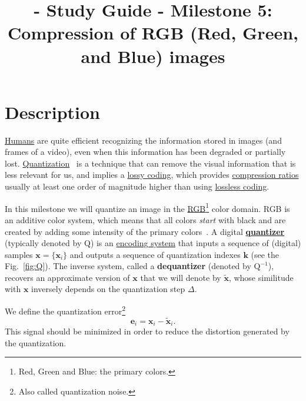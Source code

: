 
\title{\SM{} - Study Guide - Milestone 5: Compression of RGB (Red, Green, and Blue) images}

\maketitle

\tableofcontents

\section{Description}
\href{https://en.wikipedia.org/wiki/Visual_system}{Humans} are quite
efficient recognizing the information stored in images (and frames of
a video), even when this information has been degraded or partially
lost. \href{https://en.wikipedia.org/wiki/Quantization_(signal_processing)}{Quantization}~\cite{sayood2017introduction,vetterli2014foundations}
is a technique that can remove the visual information that is less
relevant for us, and implies a
\href{https://en.wikipedia.org/wiki/Lossy_compression}{lossy coding},
which provides
\href{https://en.wikipedia.org/wiki/Data_compression_ratio}{compression
  ratios} usually at least one order of magnitude higher than using
\href{https://en.wikipedia.org/wiki/Lossless_compression}{lossless
  coding}.

In this milestone we will quantize an image in the
\href{https://en.wikipedia.org/wiki/RGB_color_model}{RGB\footnote{Red,
    Green and Blue: the primary colors.} color domain}. RGB is an
additive color system, which means that all colors \emph{start} with
black and are created by adding some intensity of the primary
colors~\cite{burger2016digital}. A digital
\href{https://en.wikipedia.org/wiki/Quantization_(signal_processing)}{\textbf{quantizer}}
(typically denoted by $\text{Q}$) is an
\href{https://en.wikipedia.org/wiki/Data_compression}{encoding system}
that inputs a sequence of (digital) samples
${\mathbf x}=\{{\mathbf x}_i\}$ and outputs a sequence of quantization
indexes ${\mathbf k}$ (see the Fig.~\ref{fig:Q}). The inverse system,
called a \textbf{dequantizer} (denoted by $\text{Q}^{-1}$), recovers
an approximate version of ${\mathbf x}$ that we will denote by
$\tilde{{\mathbf x}}$, whose similitude with ${\mathbf x}$ inversely
depends on the quantization step $\Delta$. %

We define the quantization error\footnote{Also called quantization
noise.}
\begin{equation}
  {\mathbf e}_i = {\mathbf x}_i - \tilde{{\mathbf x}}_i.
\end{equation}
This signal should be minimized in order to reduce the distortion
generated by the quantization.

